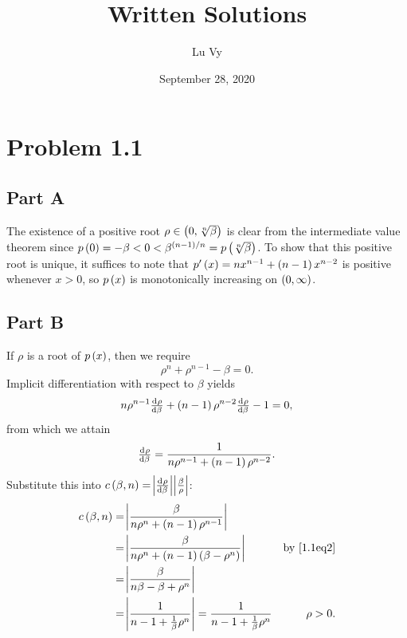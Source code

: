 \documentclass[12pt]{article}
\theoremstyle{definition}
\begin{document}
\begin{titlepage}
\title{Written Solutions}
\author{Lu Vy}
\date{September 28, 2020}
\maketitle
\thispagestyle{empty}
\end{titlepage}

\section*{Problem 1.1}
\subsection*{Part A}
The existence of a positive root $\rho \in \del{0,\sqrt[n]{\beta}}$ is clear from the intermediate value theorem since $p\del{0} = -\beta < 0 < \beta^{\del{n-1}/n} = p\del{\sqrt[n]{\beta}}$. To show that this positive root is unique, it suffices to note that $p'\del{x} = nx^{n-1} + \del{n-1}x^{n-2}$ is positive whenever $x > 0$, so $p\del{x}$ is monotonically increasing on $\del{0,\infty}$.

\subsection*{Part B}
If $\rho$ is a root of $p\del{x}$, then we require
\begin{equation}
\label{1.1eq2}
\rho^n + \rho^{n-1} - \beta = 0.
\end{equation}
Implicit differentiation with respect to $\beta$ yields
$$
n\rho^{n-1} \od{\rho}{\beta} + \del{n-1}\rho^{n-2} \od{\rho}{\beta} - 1 = 0,
$$
from which we attain
\begin{equation}
\label{1.1eq1}
\od{\rho}{\beta} = \frac{1}{n\rho^{n-1}+\del{n-1}\rho^{n-2}}.
\end{equation}
Substitute this into $c\del{\beta,n}= \abs{\od{\rho}{\beta}}\abs{\frac{\beta}{\rho}} $:
\begin{align*}
c\del{\beta,n} &= \abs{\frac{\beta}{n\rho^{n}+\del{n-1}\rho^{n-1}}} \\
&= \abs{\frac{\beta}{n\rho^{n}+\del{n-1}\del{\beta - \rho^{n}}}} & \text{by \eqref{1.1eq2}} \\
&= \abs{\frac{\beta}{n\beta - \beta + \rho^n}} \\
&= \abs{\frac{1}{n-1 + \frac{1}{\beta}\rho^n}} = \frac{1}{n-1 + \frac{1}{\beta}\rho^n} & \rho > 0.
\end{align*}
\end{document}
